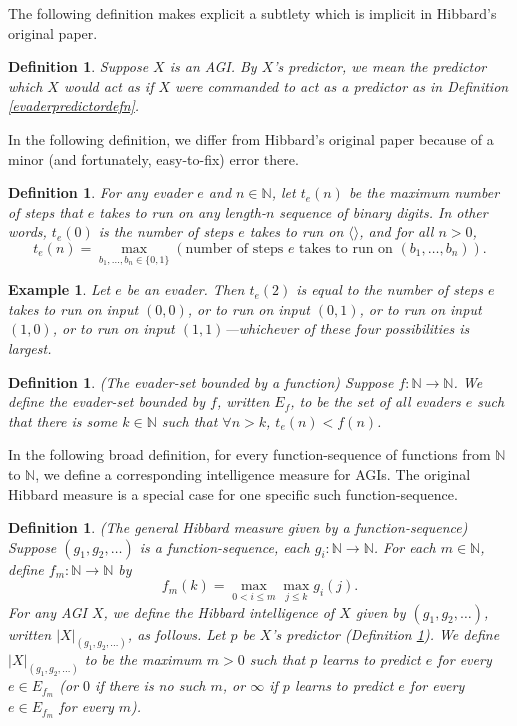 \documentclass{article}
\newtheorem{definition}[theorem]{Definition}
\newtheorem{example}[theorem]{Example}
\begin{document}
The following definition makes explicit a subtlety which is implicit in Hibbard's
original paper.

\begin{definition}
\label{Xspredictordefn}
    Suppose $X$ is an AGI. By \emph{$X$'s predictor}, we mean the predictor which
    $X$ would act as if $X$ were commanded to act as a predictor as in
    Definition \ref{evaderpredictordefn}.
\end{definition}

In the following definition, we differ from Hibbard's original paper
because of a minor (and fortunately, easy-to-fix) error there.

\begin{definition}
\label{tsubedefinition}
    For any evader $e$ and $n\in\mathbb N$,
    let $t_e(n)$ be the maximum number of steps that $e$ takes to run
    on any length-$n$ sequence of binary digits.
    In other words, $t_e(0)$ is the number of steps $e$ takes to run on
    $\langle\rangle$, and for all $n>0$,
    \[
        t_e(n) = \max_{b_1,\ldots,b_n\in \{0,1\}}
        (\text{number of steps $e$ takes to run on $(b_1,\ldots,b_n)$}).
    \]
\end{definition}

\begin{example}
Let $e$ be an evader. Then
    $t_e(2)$ is equal to the number of steps $e$ takes to run on input
    $(0,0)$, or to run on input $(0,1)$, or to run on input $(1,0)$, or to run on input
    $(1,1)$---whichever of these four possibilities is largest.
\end{example}

\begin{definition}
\label{evadersetdefinition}
    (The evader-set bounded by a function)
    Suppose $f:\mathbb N\to\mathbb N$. We define the \emph{evader-set bounded by $f$},
    written $E_f$, to be the set of all evaders $e$ such that
    there is some $k\in\mathbb N$ such that $\forall n>k$,
    $t_e(n)<f(n)$.
\end{definition}

In the following broad definition, for every function-sequence of functions
from $\mathbb N$ to $\mathbb N$, we define a corresponding intelligence measure
for AGIs.
The original Hibbard measure is a special case for one specific
such function-sequence.

\begin{definition}
\label{generalintelligencemeasuredefn}
    (The general Hibbard measure given by a function-sequence)
    Suppose $(g_1,g_2,\ldots)$ is a function-sequence,
    each $g_i:\mathbb N\to\mathbb N$.
    For each $m\in\mathbb N$, define $f_m:\mathbb N\to\mathbb N$ by
    \[f_m(k)=\max_{0<i\leq m}\max_{j\leq k}g_i(j).\]
    For any AGI $X$, we define the \emph{Hibbard intelligence of $X$
    given by $(g_1,g_2,\ldots)$}, written $|X|_{(g_1,g_2,\ldots)}$, as follows.
    Let $p$ be $X$'s predictor (Definition \ref{Xspredictordefn}).
    We define $|X|_{(g_1,g_2,\ldots)}$ to be the maximum $m>0$
    such that $p$ learns to predict $e$ for every $e\in E_{f_m}$
    (or $0$ if there is no such $m$, or $\infty$ if $p$ learns to predict $e$
    for every $e\in E_{f_m}$ for every $m$).
\end{definition}
\end{document}
